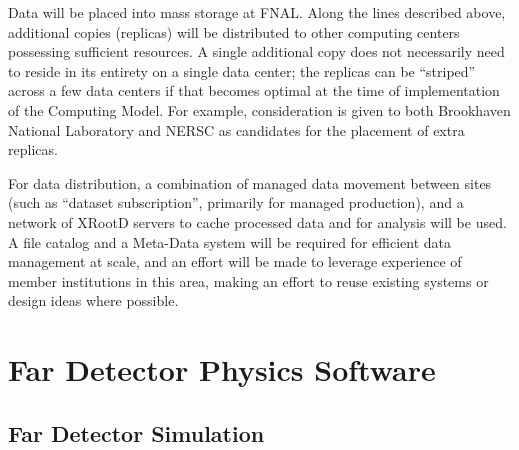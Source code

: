 Data will be placed into mass storage at FNAL. Along the lines described above, additional copies (replicas) will be distributed to other
computing centers possessing sufficient resources.
A single additional copy does not necessarily need to reside in its entirety on a single data center; the replicas can be ``striped'' across a few data centers if that
becomes optimal at the time of implementation of the Computing Model. For example, consideration is given to both Brookhaven National Laboratory
and NERSC as candidates for the placement of extra replicas.

For data distribution, a combination of managed data movement between sites (such as ``dataset subscription'',
primarily for managed production), and a network of XRootD servers to cache processed data and for analysis will be used.
A file catalog and a Meta-Data system will be required for efficient data management at scale, and an effort will be made to leverage experience of
member institutions in this area, making an effort to reuse existing systems or design ideas where possible.


\section{Far Detector Physics Software}
\label{sec:detectors-sc-physics-software}


\subsection{Far Detector Simulation}
\label{sec:detectors-sc-physics-software-simulation-fd}

